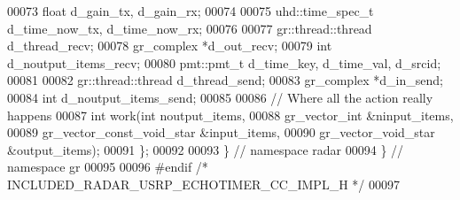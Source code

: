 \begin{DoxyCode}
00073       \textcolor{keywordtype}{float} d_gain_tx, d_gain_rx;
00074       
00075       uhd::time\_spec\_t d_time_now_tx, d_time_now_rx;
00076       
00077       gr::thread::thread d_thread_recv;
00078       gr\_complex *d_out_recv;
00079       \textcolor{keywordtype}{int} d_noutput_items_recv;
00080       pmt::pmt\_t d_time_key, d_time_val, d_srcid;
00081       
00082       gr::thread::thread d_thread_send;
00083       gr\_complex *d_in_send;
00084       \textcolor{keywordtype}{int} d_noutput_items_send;
00085 
00086       \textcolor{comment}{// Where all the action really happens}
00087       \textcolor{keywordtype}{int} work(\textcolor{keywordtype}{int} noutput\_items,
00088                gr\_vector\_int &ninput\_items,
00089                gr\_vector\_const\_void\_star &input\_items,
00090                gr\_vector\_void\_star &output\_items);
00091     \};
00092 
00093   \} \textcolor{comment}{// namespace radar}
00094 \} \textcolor{comment}{// namespace gr}
00095 
00096 \textcolor{preprocessor}{#endif }\textcolor{comment}{/* INCLUDED\_RADAR\_USRP\_ECHOTIMER\_CC\_IMPL\_H */}\textcolor{preprocessor}{}
00097 
\end{DoxyCode}
